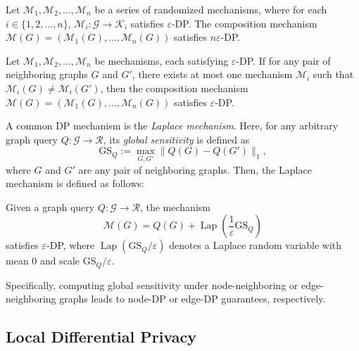 \begin{lemma} 
\label{lem:bc}
Let $\mathcal{M}_1, \mathcal{M}_2, \dots, \mathcal{M}_n$ be a series of randomized mechanisms, 
where for each $i \in \{1, 2, \dots, n\}$,
$\mathcal{M}_i: \mathcal{G} \to \mathcal{K}_i$ satisfies $\varepsilon$-DP. 
The composition mechanism
$
\mathcal{M}(G) = (\mathcal{M}_1(G), \dots, \mathcal{M}_n(G))
$
satisfies $n\varepsilon$-DP.
\end{lemma}

\begin{lemma}
\label{lem:pc}
Let $\mathcal{M}_1, \mathcal{M}_2, \ldots, \mathcal{M}_n$ be mechanisms, each satisfying $\varepsilon$-DP. 
If for any pair of neighboring graphs $G$ and $G'$, there exists at most one mechanism $\mathcal{M}_i$ such that $\mathcal{M}_i(G) \neq \mathcal{M}_i(G')$, then the composition mechanism
$
\mathcal{M}(G) = (\mathcal{M}_1(G), \dots, \mathcal{M}_n(G))
$
satisfies $\varepsilon$-DP.
\end{lemma}



A common DP mechanism is the \textit{Laplace mechanism}. 
Here, for any arbitrary graph query $Q: \mathcal{G} \to \mathcal{R}$, its \textit{global sensitivity} is defined as
\begin{equation*}
    \mathrm{GS}_Q := \max_{G, G'} \| Q(G) - Q(G') \|_1,
\end{equation*}
where $G$ and $G'$ are any pair of neighboring graphs. Then, the Laplace mechanism is defined as follows:
\begin{definition}
\label{def:lap_mech}
Given a graph query $Q: \mathcal{G} \to \mathcal{R}$, the mechanism
\begin{equation*}
    \mathcal{M}(G) = Q(G) + \operatorname{Lap}\left(\frac{1}{\varepsilon}\mathrm{GS}_Q\right)
\end{equation*}
satisfies $\varepsilon$-DP, where $\operatorname{Lap}(\mathrm{GS}_Q/\varepsilon)$ denotes a Laplace random variable with mean $0$ and scale $\mathrm{GS}_Q/\varepsilon$.
\end{definition}
Specifically, computing global sensitivity under node-neighboring or edge-neighboring graphs leads to node-DP or edge-DP guarantees, respectively.





\subsection{Local Differential Privacy}
\label{subsec:ldp}



